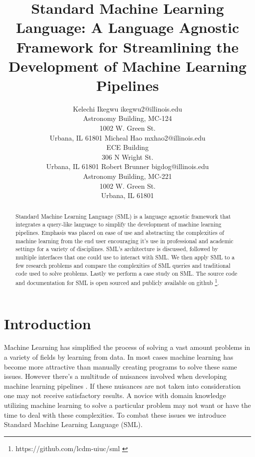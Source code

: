 \documentclass[jair,twoside,11pt,theapa]{article}
\begin{document}
\title{Standard Machine Learning Language: A Language Agnostic Framework for Streamlining the Development of Machine Learning Pipelines}

\author{\name Kelechi Ikegwu \email ikegwu2@illinois.edu \\
        Astronomy Building, MC-124 \\1002 W. Green St.\\ Urbana, IL  61801
       \AND
       \name Micheal Hao  \email mxhao2@illinois.edu \\
       \addr ECE Building \\306 N Wright St. \\ Urbana, IL 61801
       \AND
       \name Robert Brunner \email bigdog@illinois.edu\\
        Astronomy Building, MC-221 \\1002 W. Green St.\\ Urbana, IL  61801}


\maketitle


\begin{abstract}
Standard Machine Learning Language (SML) is a language agnostic framework that integrates a query-like language to simplify the development of machine learning pipelines. Emphasis was placed on ease of use and abstracting the complexities of machine learning from the end user encouraging it's use in professional and academic settings for a variety of disciplines. SML's architecture is discussed, followed by multiple interfaces that one could use to interact with SML. We then apply SML to a few research problems and compare the complexities of SML queries and traditional code used to solve problems. Lastly we perform a case study on SML. The source code and documentation for SML is open sourced and publicly available on github \footnote{https://github.com/lcdm-uiuc/sml \label{SML:Github}}.
\end{abstract}

\section{Introduction}
\label{Introduction}

Machine Learning has simplified the process of solving a vast amount problems in a variety of fields by learning from data. In most cases machine learning has become more attractive than manually creating programs to solve these same issues. However there's a multitude of nuisances involved when developing machine learning pipelines \cite{pedros:fewUsefulThings}. If these nuisances are not taken into consideration one may not receive satisfactory results. A novice with domain knowledge utilizing machine learning to solve a particular problem may not want or have the time to deal with these complexities. To combat these issues we introduce Standard Machine Learning Language (SML).
\end{document}

